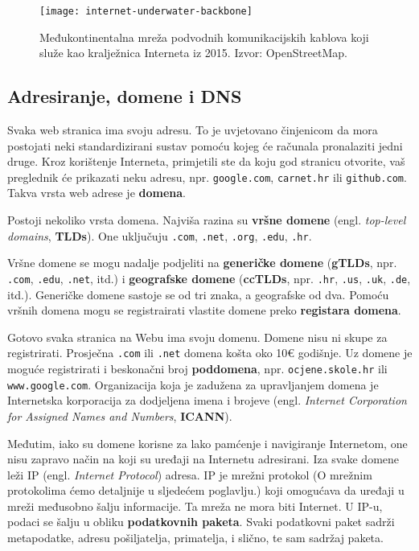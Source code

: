\begin{figure}[h]
    \texttt{[image: internet-underwater-backbone]}
    \caption{Međukontinentalna mreža podvodnih komunikacijskih kablova koji služe kao kralježnica Interneta iz 2015. Izvor: OpenStreetMap. }\label{fig:figure6}
\end{figure}

\subsection{Adresiranje, domene i DNS}

Svaka web stranica ima svoju adresu.
To je uvjetovano činjenicom da mora postojati neki standardizirani sustav pomoću kojeg će računala pronalaziti jedni druge.
Kroz korištenje Interneta, primjetili ste da koju god stranicu otvorite, vaš preglednik će prikazati neku adresu, npr. \verb|google.com|, \verb|carnet.hr| ili \verb|github.com|.
Takva vrsta web adrese je \textbf{domena}.


Postoji nekoliko vrsta domena.
Najviša razina su \textbf{vršne domene} (engl. \textit{top-level domains}, \textbf{TLDs}).
One uključuju \verb|.com|, \verb|.net|, \verb|.org|, \verb|.edu|, \verb|.hr|.

Vršne domene se mogu nadalje podjeliti na \textbf{generičke domene} (\textbf{gTLDs}, npr. \verb|.com|, \verb|.edu|, \verb|.net|, itd.) i \textbf{geografske domene} (\textbf{ccTLDs}, npr. \verb|.hr|, \verb|.us|, \verb|.uk|, \verb|.de|, itd.).
Generičke domene sastoje se od tri znaka, a geografske od dva.
Pomoću vršnih domena mogu se registrairati vlastite domene preko \textbf{registara domena}.


Gotovo svaka stranica na Webu ima svoju domenu.
Domene nisu ni skupe za registrirati.
Prosječna \verb|.com| ili \verb|.net| domena košta oko 10€ godišnje.
Uz domene je moguće registrirati i beskonačni broj \textbf{poddomena}, npr. \verb|ocjene.skole.hr| ili \verb|www.google.com|.
Organizacija koja je zadužena za upravljanjem domena je Internetska korporacija za dodjeljena imena i brojeve (engl. \textit{Internet Corporation for Assigned Names and Numbers}, \textbf{ICANN}).

Međutim, iako su domene korisne za lako pamćenje i navigiranje Internetom, one nisu zapravo način na koji su uređaji na Internetu adresirani.
Iza svake domene leži IP (engl. \textit{Internet Protocol}) adresa.
IP je mrežni protokol (O mrežnim protokolima ćemo detaljnije u sljedećem poglavlju.) koji omogućava da uređaji u mreži međusobno šalju informacije.
Ta mreža ne mora biti Internet.
U IP-u, podaci se šalju u obliku \textbf{podatkovnih paketa}.
Svaki podatkovni paket sadrži metapodatke, adresu pošiljatelja, primatelja, i slično, te sam sadržaj paketa.

